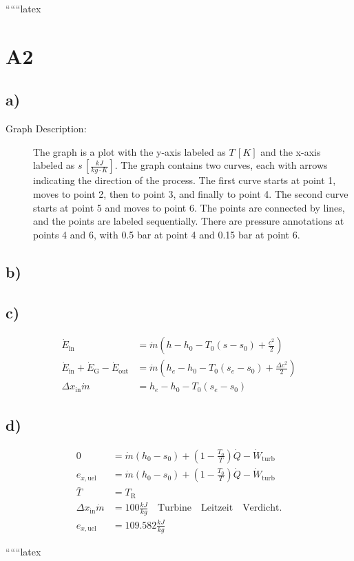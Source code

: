 
``````latex


\section*{A2}

\subsection*{a)}
\begin{description}
    \item[Graph Description:] The graph is a plot with the y-axis labeled as \( T \, [K] \) and the x-axis labeled as \( s \, [\frac{kJ}{kg \cdot K}] \). The graph contains two curves, each with arrows indicating the direction of the process. The first curve starts at point 1, moves to point 2, then to point 3, and finally to point 4. The second curve starts at point 5 and moves to point 6. The points are connected by lines, and the points are labeled sequentially. There are pressure annotations at points 4 and 6, with 0.5 bar at point 4 and 0.15 bar at point 6.
\end{description}

\subsection*{b)}

\subsection*{c)}
\begin{align*}
    \dot{E}_{\text{in}} &= \dot{m} \left( h - h_0 - T_0 (s - s_0) + \frac{c^2}{2} \right) \\
    \dot{E}_{\text{in}} + \dot{E}_{\text{G}} - \dot{E}_{\text{out}} &= \dot{m} \left( h_e - h_0 - T_0 (s_e - s_0) + \frac{\Delta c^2}{2} \right) \\
    \Delta x_{\text{in}} \dot{m} &= h_e - h_0 - T_0 (s_e - s_0)
\end{align*}

\subsection*{d)}
\begin{align*}
    0 &= \dot{m} \left( h_0 - s_0 \right) + \left( 1 - \frac{T_0}{T} \right) \dot{Q} - \dot{W}_{\text{turb}} \\
    e_{x, \text{uel}} &= \dot{m} \left( h_0 - s_0 \right) + \left( 1 - \frac{T_0}{T} \right) \dot{Q} - \dot{W}_{\text{turb}} \\
    \bar{T} &= T_{\text{R}} \\
    \Delta x_{\text{in}} \dot{m} &= 100 \frac{kJ}{kg} \quad \text{Turbine} \quad \text{Leitzeit} \quad \text{Verdicht.} \\
    e_{x, \text{uel}} &= 109.582 \frac{kJ}{kg}
\end{align*}

``````latex


